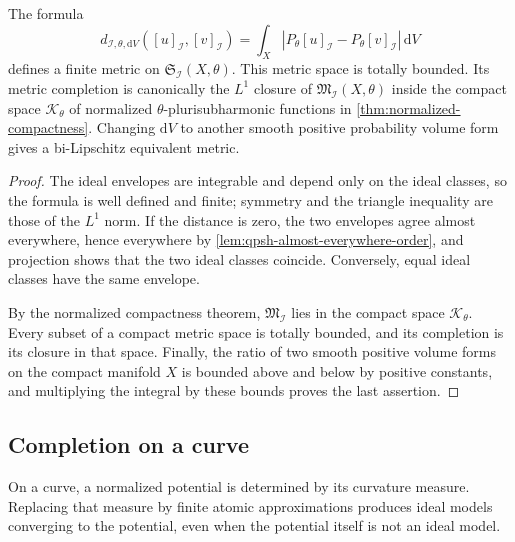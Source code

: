 \begin{proposition}\label{prop:ideal-lone-metric}
The formula
\begin{equation}\label{eq:ideal-lone-metric}
 d_{\mathcal I,\theta,\mathrm{d}V}([u]_{\mathcal I},[v]_{\mathcal I})
      =\int_X|P_\theta[u]_{\mathcal I}-P_\theta[v]_{\mathcal I}|\,\mathrm{d}V
\end{equation}
defines a finite metric on $\mathfrak S_{\mathcal I}(X,\theta)$. This metric space is totally bounded. Its metric completion is canonically the $L^1$ closure of $\mathfrak M_{\mathcal I}(X,\theta)$ inside the compact space $\mathcal K_\theta$ of normalized $\theta$-plurisubharmonic functions in \cref{thm:normalized-compactness}. Changing $\mathrm{d}V$ to another smooth positive probability volume form gives a bi-Lipschitz equivalent metric.
\end{proposition}
\begin{proof}
The ideal envelopes are integrable and depend only on the ideal classes, so the formula is well defined and finite; symmetry and the triangle inequality are those of the $L^1$ norm. If the distance is zero, the two envelopes agree almost everywhere, hence everywhere by \cref{lem:qpsh-almost-everywhere-order}, and projection shows that the two ideal classes coincide. Conversely, equal ideal classes have the same envelope.

By the normalized compactness theorem, $\mathfrak M_{\mathcal I}$ lies in the compact space $\mathcal K_\theta$. Every subset of a compact metric space is totally bounded, and its completion is its closure in that space. Finally, the ratio of two smooth positive volume forms on the compact manifold $X$ is bounded above and below by positive constants, and multiplying the integral by these bounds proves the last assertion.
\end{proof}

\subsection{Completion on a curve}

On a curve, a normalized potential is determined by its curvature measure. Replacing that measure by finite atomic approximations produces ideal models converging to the potential, even when the potential itself is not an ideal model.

